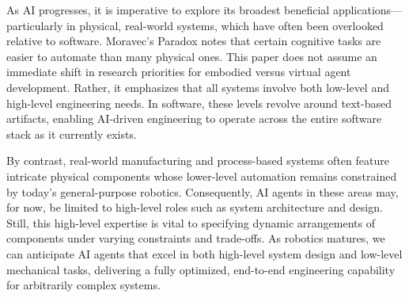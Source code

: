As AI progresses, it is imperative to explore its broadest beneficial applications—particularly in physical, real-world systems, which have often been overlooked relative to software. Moravec’s Paradox notes that certain cognitive tasks are easier to automate than many physical ones. This paper does not assume an immediate shift in research priorities for embodied versus virtual agent development. Rather, it emphasizes that all systems involve both low-level and high-level engineering needs. In software, these levels revolve around text-based artifacts, enabling AI-driven engineering to operate across the entire software stack as it currently exists.

By contrast, real-world manufacturing and process-based systems often feature intricate physical components whose lower-level automation remains constrained by today’s general-purpose robotics. Consequently, AI agents in these areas may, for now, be limited to high-level roles such as system architecture and design. Still, this high-level expertise is vital to specifying dynamic arrangements of components under varying constraints and trade-offs. As robotics matures, we can anticipate AI agents that excel in both high-level system design and low-level mechanical tasks, delivering a fully optimized, end-to-end engineering capability for arbitrarily complex systems.

